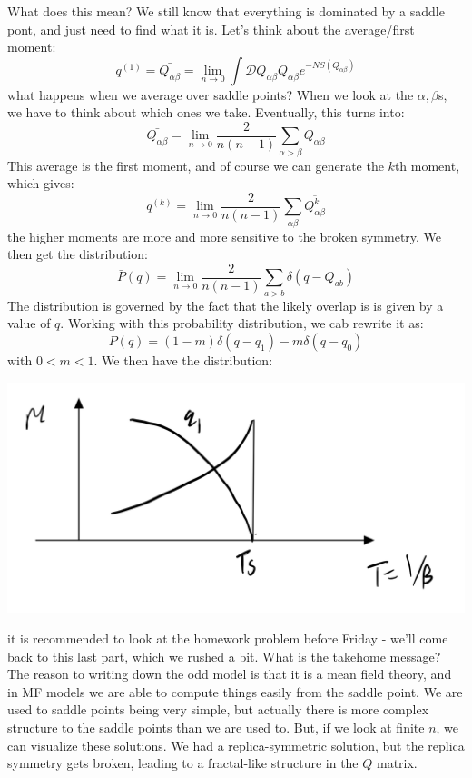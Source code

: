 What does this mean? We still know that everything is dominated by a saddle pont, and just need to find what it is. Let's think about the average/first moment:
\begin{equation}
    q^{(1)} = \bar{Q_{\alpha\beta}}= \lim_{n\to 0} \int \mathcal{D}Q_{\alpha\beta}Q_{\alpha\beta}e^{-NS(Q_{\alpha\beta})}
\end{equation}
what happens when we average over saddle points? When we look at the $\alpha, \beta$s, we have to think about which ones we take. Eventually, this turns into:
\begin{equation}
    \bar{Q_{\alpha\beta}}= \lim_{n \to 0}\frac{2}{n(n-1)}\sum_{\alpha>\beta}Q_{\alpha\beta}
\end{equation}
This average is the first moment, and of course we can generate the $k$th moment, which gives:
\begin{equation}
    q^{(k)} = \lim_{n \to 0}\frac{2}{n(n-1)}\sum_{\alpha\beta}\overline{Q_{\alpha\beta}^k}
\end{equation}
the higher moments are more and more sensitive to the broken symmetry. We then get the distribution:
\begin{equation}
    \bar{P}(q) = \lim_{n \to 0}\frac{2}{n(n-1)}\sum_{a > b}\delta(q - Q_{ab})
\end{equation}
The distribution is governed by the fact that the likely overlap is is given by a value of $q$. Working with this probability distribution, we cab rewrite it as:
\begin{equation}
    P(q) = (1-m)\delta(q - q_1) - m\delta(q - q_0)
\end{equation}
with $0 < m < 1$. We then have the distribution:

\begin{center}
    \includegraphics[scale=0.3]{Lectures/Figures/lec14-orderparam.png}
\end{center}

it is recommended to look at the homework problem before Friday - we'll come back to this last part, which we rushed a bit. What is the takehome message? The reason to writing down the odd model is that it is a mean field theory, and in MF models we are able to compute things easily from the saddle point. We are used to saddle points being very simple, but actually there is more complex structure to the saddle points than we are used to. But, if we look at finite $n$, we can visualize these solutions. We had a replica-symmetric solution, but the replica symmetry gets broken, leading to a fractal-like structure in the $Q$ matrix.
